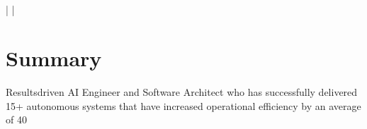\documentclass{article}
\begin{document}
\section*{}
\subsection*{}
 |  | 

\section*{Summary}
Resultsdriven AI Engineer and Software Architect who has successfully delivered 15+ autonomous systems that have increased operational efficiency by an average of 40%
\end{document}
